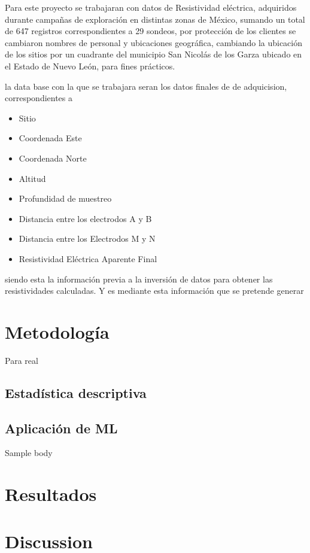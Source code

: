 \documentclass[sn-mathphys,Numbered]{sn-jnl}%
\theoremstyle{thmstyleone}%
\theoremstyle{thmstyletwo}%
\theoremstyle{thmstylethree}%
\begin{document}
Para este proyecto se trabajaran con datos de Resistividad eléctrica, adquiridos durante campañas de exploración en distintas zonas de México, sumando un total de 647 registros correspondientes a 29 sondeos, por protección de los clientes se cambiaron nombres de personal y ubicaciones geográfica, cambiando la ubicación de los sitios por un cuadrante del municipio San Nicolás de los Garza ubicado en el Estado de Nuevo León, para fines prácticos.

la data base con la que se trabajara seran los datos finales de de adquicision, correspondientes a 

\begin{itemize} 
	\item  Sitio
	\item  Coordenada Este
	\item  Coordenada Norte
	\item  Altitud 
	\item  Profundidad de muestreo
	\item  Distancia entre los electrodos A y B
	\item  Distancia entre los Electrodos M y N
	\item  Resistividad Eléctrica Aparente Final
\end{itemize}
siendo esta la información previa a la inversión de datos para obtener las resistividades calculadas. Y es mediante esta información que se pretende generar 

\section{Metodología}\label{sec2}

Para real

\subsection{Estad\'istica descriptiva}\label{subsec1}

\subsection{Aplicaci\'on de ML}\label{subsec2}

Sample body

\section{Resultados}\label{sec4}


\section{Discussion}\label{sec12}
\end{document}
